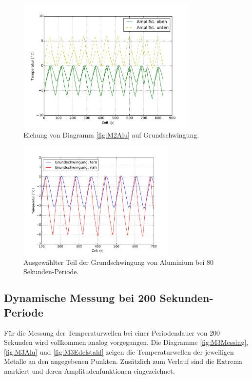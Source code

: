 \begin{figure}[h!]
	\centering
	\includegraphics[width=0.8\textwidth]{Bilder/Normierungsauswahl/M2_Alu_norm.pdf}
	\caption{Eichung von Diagramm \ref{fig:M2Alu} auf Grundschwingung.}
	\label{fig:M2AluNorm}
\end{figure}
\begin{figure}[h!]
	\centering
	\includegraphics[width=0.7\textwidth]{Bilder/M2_Alu_norm.pdf}
	\caption{Ausgewählter Teil der Grundschwingung von Aluminium bei 80 Sekunden-Periode.}
	\label{fig:M2AluNormkurve}
\end{figure}

\subsection{Dynamische Messung bei 200 Sekunden-Periode}
Für die Messung der Temperaturwellen bei einer Periodendauer von 200 Sekunden wird vollkommen analog vorgegangen.
Die Diagramme \ref{fig:M3Messing}, \ref{fig:M3Alu} und \ref{fig:M3Edelstahl} zeigen die Temperaturwellen der jeweiligen Metalle an den angegebenen Punkten. 
Zusätzlich zum Verlauf sind die Extrema markiert und deren Amplitudenfunktionen eingezeichnet.

